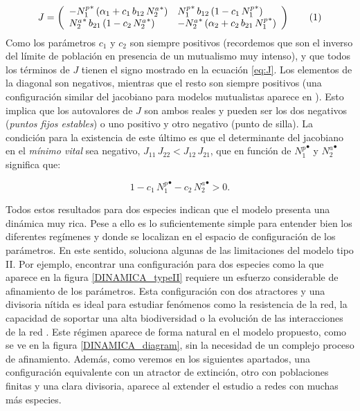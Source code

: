 \begin{equation}
J = \left(
\begin{array}{ll}
- {N^{p}_{1}}^* \, (\alpha_{1}+ c_{1}\, b_{12} \, {N^a_2}^* )  & {N_{1}^{p}}^* \, b_{12} \, (1 - c_{1}\, {N_{1}^{p}}^* ) \\
{N_{2}^{a}}^* \, b_{21}\, (1 - c_{2}\, {N_{2}^{a}}^* ) & - {N_{2}^{a}}^* \, (\alpha_{2}+ c_{2}\,b_{21}\,{N_{1}^{p}}^* )
\end{array}
\right)\stepcounter{equation}\tag{\theequation}\label{eq:J}
\end{equation}
Como los parámetros $c_{1}$ y $c_2$ son siempre positivos (recordemos que son el inverso del límite de población en presencia de un mutualismo muy intenso), y que todos los términos de $J$ tienen el signo mostrado en la ecuación \ref{eq:J}. Los elementos de la diagonal son negativos, mientras que el resto son siempre positivos (una configuración similar del jacobiano para modelos mutualistas aparece en \cite{goh1979}). Esto implica que los autovalores de $J$ son ambos reales y pueden ser los dos negativos (\textit{puntos fijos estables}) o uno positivo y otro negativo (punto de silla). La condición para la existencia de este último es que el determinante del jacobiano en el \textit{mínimo vital} sea negativo, $J_{11} \, J_{22} < J_{12}\, J_{21}$, que en función de ${N_{1}^{p}}^\bullet$ y ${N_{2}^{a}}^\bullet$ significa que:

\begin{equation}
1-c_{1}\, {N_{1}^{p}}^\bullet - c_{2}\, {N_{2}^{a}}^\bullet > 0 .
\end{equation}

Todos estos resultados para dos especies indican que el modelo presenta una dinámica muy rica. Pese a ello es lo suficientemente simple para entender bien los diferentes regímenes y donde se localizan en el espacio de configuración de los parámetros. En este sentido, soluciona algunas de las limitaciones del modelo tipo II. Por ejemplo, encontrar una configuración para dos especies como la que aparece en la figura \ref{DINAMICA_typeII} requiere un esfuerzo considerable de afinamiento de los parámetros. Esta configuración con dos atractores y una divisoria nítida es ideal para estudiar fenómenos como la resistencia de la red, la capacidad de soportar una alta biodiversidad o la evolución de las interacciones de la red \cite{bastolla2009, suweis2013emergence}. Este régimen aparece de forma natural en el modelo propuesto, como se ve en la figura \ref{DINAMICA_diagram}, sin la necesidad de un complejo proceso de afinamiento. Además, como veremos en los siguientes apartados, una configuración equivalente con un atractor de extinción, otro con poblaciones finitas y una clara divisoria, aparece al extender el estudio a redes con muchas más
especies.

